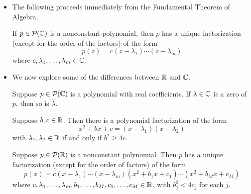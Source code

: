 \documentclass[../main.tex]{subfiles}
\begin{document}
\begin{itemize}
\begin{theorem}
    \end{theorem}
    \item The following proceeds immediately from the Fundamental Theorem of Algebra.
    \begin{theorem}\label{trm:polFactorization}
        If $p\in\mathcal{P}_{}(\mathbb{C})$ is a nonconstant polynomial, then $p$ has a unique factorization (except for the order of the factors) of the form
        \begin{equation*}
            p(z) = c(z-\lambda_1)\cdots(z-\lambda_m)
        \end{equation*}
        where $c,\lambda_1,\dots,\lambda_m\in\mathbb{C}$.
    \end{theorem}
    \item We now explore some of the differences between $\mathbb{R}$ and $\mathbb{C}$.
    \begin{theorem}
        Suppose $p\in\mathcal{P}_{}(\mathbb{C})$ is a polynomial with real coefficients. If $\lambda\in\mathbb{C}$ is a zero of $p$, then so is $\bar{\lambda}$.
    \end{theorem}
    \begin{theorem}
        Suppose $b,c\in\mathbb{R}$. Then there is a polynomial factorization of the form
        \begin{equation*}
            x^2+bx+c = (x-\lambda_1)(x-\lambda_2)
        \end{equation*}
        with $\lambda_1,\lambda_2\in\mathbb{R}$ if and only if $b^2\geq 4c$.
    \end{theorem}
    \begin{theorem}\label{trm:realPolFactorization}
        Suppose $p\in\mathcal{P}_{}(\mathbb{R})$ is a nonconstant polynomial. Then $p$ has a unique factorization (except for the order of factors) of the form
        \begin{equation*}
            p(x) = c(x-\lambda_1)\cdots(x-\lambda_m)(x^2+b_1x+c_1)\cdots(x^2+b_Mx+c_M)
        \end{equation*}
        where $c,\lambda_1,\dots,\lambda_m,b_1,\dots,b_M,c_1,\dots,c_M\in\mathbb{R}$, with $b_j^2<4c_j$ for each $j$.
    \end{theorem}
\end{itemize}
\end{document}

